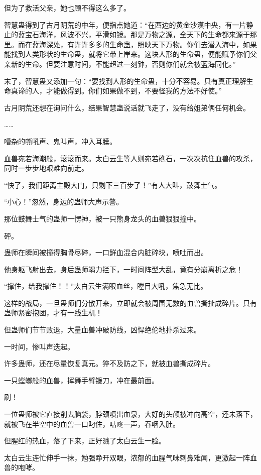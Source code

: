 \begin{this_body}
但为了救活父亲，她也顾不得这么多了。

智慧蛊得到了古月阴荒的中年，便指点她道：“在西边的黄金沙漠中央，有一片静止的蓝宝石海洋，风波不兴，平滑如镜。那是万物之源，全天下的生命都来源于那里。而在蓝海深处，有许许多多的生命蛊，照映天下万物。你们去潜入海中，如果能找到人类形状的生命蛊，就将它带上岸来。这块人形的生命蛊，便能赋予你们父亲新的生命。但要注意时间，不能超过一刻钟，否则你们就会被蓝海同化。”

末了，智慧蛊又添加一句：“要找到人形的生命蛊，十分不容易。只有真正理解生命真谛的人，才能做得到。你们如果做不到，不要怪我的方法不好使。”

古月阴荒还想在询问什么，结果智慧蛊说话就飞走了，没有给姐弟俩任何机会。

……

嘈杂的嘶吼声、鬼叫声，冲入耳膜。

血兽宛若海潮般，滚滚而来。太白云生等人则宛若礁石，一次次抗住血兽的攻杀，同时一步步地艰难向前走。

“快了，我们距离主殿大门，只剩下三百步了！”有人大叫，鼓舞士气。

“小心！”忽然，身边的蛊师大声示警。

那位鼓舞士气的蛊师一愣神，被一只熊身龙头的血兽狠狠撞中。

砰。

蛊师在瞬间被撞得胸骨尽碎，一口鲜血混合内脏碎块，喷吐而出。

他身躯飞射出去，身后蛊师竭力拦下，一时间阵型大乱，竟有分崩离析之危！

“撑住，给我撑住！！”太白云生满眼血丝，瞠目大吼，焦急无比。

这样的战局，一旦蛊师们分散开来，立即就会被周围无数的血兽撕扯成碎片。只有蛊师紧密抱团，才有一线生机！

但蛊师们节节败退，大量血兽冲破防线，凶悍绝伦地扑杀过来。

一时间，惨叫声迭起。

许多蛊师，还在尽量恢复真元。猝不及防之下，就被血兽撕成碎片。

一只螳螂般的血兽，挥舞手臂镰刀，冲在最前面。

刷！

一位蛊师被它直接削去脑袋，脖颈喷出血泉，大好的头颅被冲向高空，还未落下，就被飞在半空中的血兽一口叼住，咕咚一声，吞咽入肚。

但腥红的热血，落了下来，正好溅了太白云生一脸。

太白云生连忙伸手一抹，勉强睁开双眼，浓郁的血腥气味刺鼻难闻，更激起一阵血兽的咆哮。


\end{this_body}
